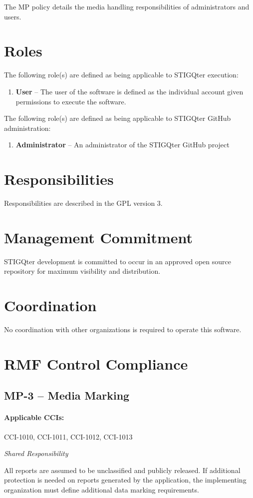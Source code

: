 \documentclass[letterpaper, 10pt, twoside]{article}
\begin{document}
The MP policy details the media handling responsibilities of administrators and users.

\section{Roles}
\label{sec:roles}

The following role(s) are defined as being applicable to STIGQter execution:
\begin{enumerate}
	\item \textbf{User} -- The user of the software is defined as the individual account given permissions to execute the software.
\end{enumerate}

The following role(s) are defined as being applicable to STIGQter GitHub administration:
\begin{enumerate}
	\item \textbf{Administrator} -- An administrator of the STIGQter GitHub project
\end{enumerate}

\section{Responsibilities}
\label{sec:responsibilities}

Responsibilities are described in the GPL version 3.

\section{Management Commitment}

STIGQter development is committed to occur in an approved open source repository for maximum visibility and distribution.

\section{Coordination}

No coordination with other organizations is required to operate this software.

\section{RMF Control Compliance}

\subsection{MP-3 -- Media Marking}

\paragraph{Applicable CCIs:} CCI-1010, CCI-1011, CCI-1012, CCI-1013

\textit{Shared Responsibility}

All reports are assumed to be unclassified and publicly released. If additional protection is needed on reports generated by the application, the implementing organization must define additional data marking requirements.

\clearpage
\printbibliography
\end{document}
